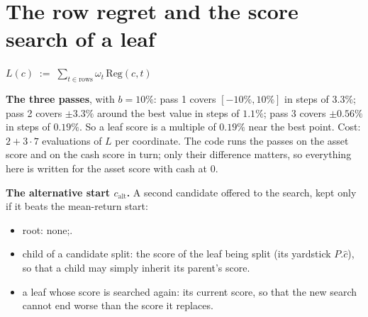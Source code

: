 \documentclass[11pt,a4paper]{article}
\newcommand{\1}{\mathbf{1}}
\newcommand{\Reg}{\mathrm{Reg}}
\newcommand{\U}{\mathsf{U}}
\newcommand{\B}{\mathsf{B}}
\begin{document}
\section{The row regret and the score search of a leaf}
\begin{algorithm}[H]
\caption{\texttt{REG}($c$, $t$) (\texttt{\_regret\_rows}) and \texttt{FIT\_LEAF}(rows, $\omega$, $c_{\mathrm{alt}}$) (\texttt{\_fit\_leaf})}
\Fn{\Reg{$c$, $t$}}{
  $w\gets w^\star(c;\U[t],\Sigma_t)$\;
  \Return $\max\big(\B[t]-\text{utility}(w;r_t,\U[t],\Sigma_t),\,10^{-6}\big)$\;
}
$L(c)\;:=\;\sum_{t\in\text{rows}}\omega_t\,\Reg(c,t)$ 
\BlankLine
{}
\end{algorithm}
\textbf{The three passes}, with $b=10\%$: pass 1 covers $[-10\%,10\%]$ in steps of $3.3\%$; pass 2 covers $\pm3.3\%$ around the best value in steps of $1.1\%$; pass 3 covers $\pm0.56\%$ in steps of $0.19\%$. So a leaf score is a multiple of $0.19\%$ near the best point. Cost: $2+3\cdot7$ evaluations of $L$ per coordinate. The code runs the passes on the asset score and on the cash score in turn; only their difference matters, so everything here is written for the asset score with cash at $0$.

\textbf{The alternative start $c_{\mathrm{alt}}$.} A second candidate offered to the search, kept only if it beats the mean-return start:
\begin{itemize}\setlength{\itemsep}{1pt}
\item root: none;.
\item child of a candidate split: the score of the leaf being split (its yardstick $P.\hat c$), so that a child may simply inherit its parent's score.
\item a leaf whose score is searched again: its current score, so that the new search cannot end worse than the score it replaces.
\end{itemize}
\end{document}
